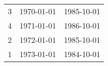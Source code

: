 % 
\begin{tabular}{ccc}
  \hline
  \hline
3 & 1970-01-01 & 1985-10-01 \\ 
  4 & 1971-01-01 & 1986-10-01 \\ 
  2 & 1972-01-01 & 1985-10-01 \\ 
  1 & 1973-01-01 & 1984-10-01 \\ 
   \hline
\end{tabular}

